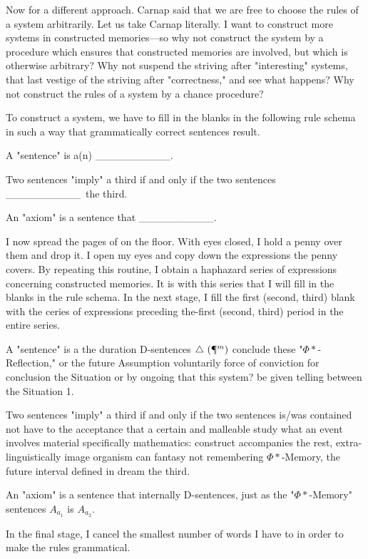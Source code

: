 Now for a different approach. Carnap said that we are free to choose 
the rules of a system arbitrarily. Let us take Carnap literally. I want to 
construct more systems in constructed memories---so why not construct the 
system by a procedure which ensures that constructed memories are 
involved, but which is otherwise arbitrary? Why not suspend the striving 
after "interesting" systems, that last vestige of the striving after 
"correctness," and see what happens? Why not construct the rules of a 
system by a chance procedure? 

To construct a system, we have to fill in the blanks in the following rule 
schema in such a way that grammatically correct sentences result. 

\newcommand{\blankspace}{\_\_\_\_\_\_\_\_\_\_}


\begin{sysrules}
A "sentence" is a(n) \blankspace.

Two sentences "imply" a third if and only if the two sentences \blankspace\ the third. 

An "axiom" is a sentence that \blankspace.
\end{sysrules}


I now spread the pages of  on the floor. 
With eyes closed, I hold a penny over them and drop it. I open my eyes and 
copy down the expressions the penny covers. By repeating this routine, I 
obtain a haphazard series of expressions concerning constructed memories. It 
is with this series that I will fill in the blanks in the rule schema. In the next 
stage, I fill the first (second, third) blank with the ceries of expressions 
preceding the-first (second, third) period in the entire series. 


\begin{sysrules}
A "sentence" is a the duration D-sentences $\triangle\ (\mathparagraph^m)$ conclude these 
"$\Phi*$-Reflection," or the future Assumption voluntarily force of 
conviction for conclusion the Situation or by ongoing that this 
system? be given telling between the Situation 1. 

Two sentences "imply" a third if and only if the two sentences is\slash was 
contained not have to the acceptance that a certain and malleable 
study what an event involves material specifically mathematics: 
construct accompanies the rest, extra-linguistically image organism 
can fantasy not remembering $\Phi*$-Memory, the future interval defined 
in dream the third. 

An "axiom" is a sentence that internally D-sentences, just as the 
"$\Phi*$-Memory" sentences $A_{a_1}$ is $A_{a_2}$. 

In the final stage, I cancel the smallest number of words I have to in 
order to make the rules grammatical. 
\end{sysrules}

